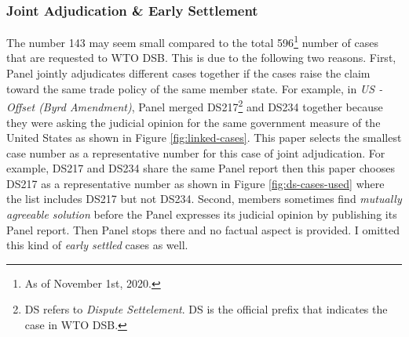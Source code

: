 \subsubsection{Joint Adjudication \& Early Settlement}
The number 143 may seem small compared to the total 596\footnote
{As of November 1st, 2020.} number of cases that are requested to WTO DSB. This is due to the following two reasons.
First, Panel jointly adjudicates different cases together if the cases raise the claim toward the
same trade policy of the same member state. For example, in \textit{US - Offset (Byrd Amendment)}, Panel merged DS217\footnote{
  DS refers to \textit{Dispute Settelement}. DS is the official prefix that indicates the case in WTO DSB.
} and DS234 together because they were asking the judicial opinion for the same government measure of the United States as shown in Figure \ref{fig:linked-cases}.
This paper selects the smallest case number as a representative number for this case of joint adjudication.
For example, DS217 and DS234 share the same Panel report then this paper chooses DS217 as a representative number as shown in Figure \ref{fig:ds-cases-used} where the list includes DS217 but not DS234.
Second, members sometimes find \textit{mutually agreeable solution} before the Panel expresses its judicial opinion by publishing its Panel report. Then Panel stops there and no factual aspect is provided. I omitted this kind of \textit{early settled} cases as well.

